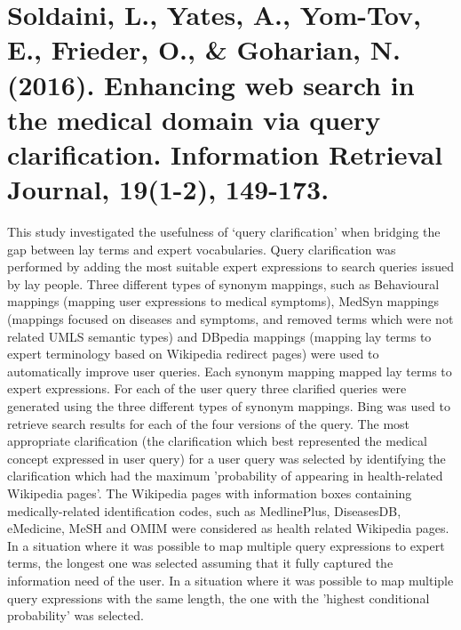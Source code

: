 \documentclass[]{article}
\begin{document}
\section{Soldaini, L., Yates, A., Yom-Tov, E., Frieder, O., \& Goharian, N. (2016). Enhancing web search in the medical domain via query clarification. Information Retrieval Journal, 19(1-2), 149-173.}

This study investigated the usefulness of ‘query clarification’ when bridging the gap between lay terms and expert vocabularies. Query clarification was performed by adding the most suitable expert expressions to search queries issued by lay people. Three different types of synonym mappings, such as Behavioural mappings (mapping user expressions to medical symptoms), MedSyn mappings (mappings focused on diseases and symptoms, and removed terms which were not related UMLS semantic types) and DBpedia  mappings (mapping lay terms to expert terminology based on Wikipedia redirect pages) were used to automatically improve user queries. Each synonym mapping mapped lay terms to expert expressions. For each of the user query three clarified queries were generated using the three different types of synonym mappings. Bing was used to retrieve search results for each of the four versions of the query. The most appropriate clarification (the clarification which best represented the medical concept expressed in user query) for a user query was selected by identifying the clarification which had the maximum 'probability of appearing in health-related Wikipedia pages'. The Wikipedia pages with information boxes containing medically-related identification codes, such as MedlinePlus, DiseasesDB, eMedicine, MeSH and OMIM were considered as health related Wikipedia pages. In a situation where it was possible to map multiple query expressions to expert terms, the longest one was selected assuming that it fully captured the information need of the user. In a situation where it was possible to map multiple query expressions with the same length, the one with the 'highest conditional probability' was selected.  
\end{document}
